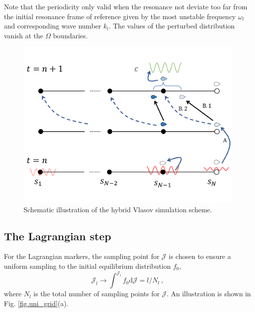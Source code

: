 Note that the periodicity only valid when the resonance not deviate too far from the initial resonance frame of reference given by the most unstable frequency $\omega_l$ and corresponding wave number $k_l$.
The values of the perturbed distribution vanish at the $\Omega$ boundaries.
\begin{figure}[htbp]
    \centering
    \includegraphics[scale=0.5]{cpc_img/Hybrid_demo.pdf}
    \caption{Schematic illustration of the hybrid Vlasov simulation scheme.}
    \label{fig.demo}
\end{figure}

\subsection{The Lagrangian step}
For the Lagrangian markers,
the sampling point for $\mathcal{J}$ is chosen to ensure  a uniform sampling to the initial equilibrium distribution $f_0$,
\begin{equation} 
    \mathcal{J}_l \to \int^{\mathcal{J}_l} f_0 \mathrm{d}\mathcal{J} = l/N_l~, 
\end{equation}
where $N_l$ is the total number of sampling points for $\mathcal{J}$. An illustration is shown in Fig. \ref{fig.uni_grid}(a).

